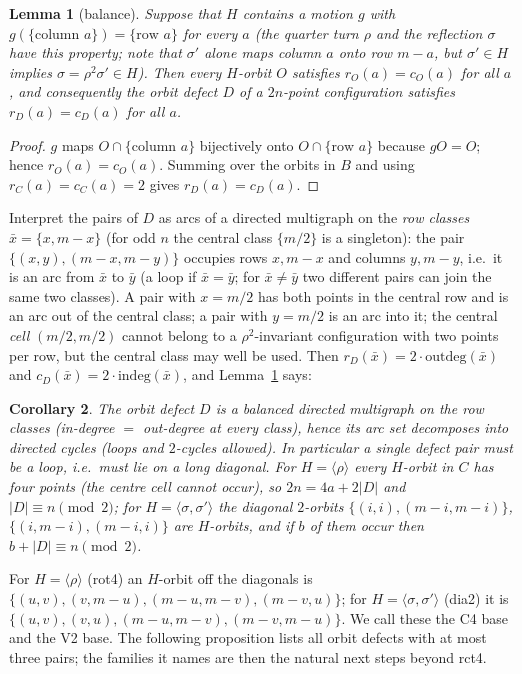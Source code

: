 \documentclass[11pt]{article}
\newtheorem{lemma}{Lemma}
\newtheorem{corollary}[lemma]{Corollary}
\theoremstyle{remark}
\newcommand{\rot}{\rho}
\begin{document}
\begin{lemma}[balance]\label{lem:balance}
Suppose that $H$ contains a motion $g$ with $g(\{\text{column }a\})=\{\text{row }a\}$ for every $a$ (the quarter turn
$\rot$ and the reflection $\sigma$ have this property; note that $\sigma'$ alone maps column $a$ onto row $m-a$, but
$\sigma'\in H$ implies $\sigma=\rot^2\sigma'\in H$).  Then every $H$-orbit $O$ satisfies $r_O(a)=c_O(a)$ for all $a$, and
consequently the orbit defect $D$ of a $2n$-point configuration satisfies $r_D(a)=c_D(a)$ for all $a$.
\end{lemma}
\begin{proof}
$g$ maps $O\cap\{\text{column }a\}$ bijectively onto $O\cap\{\text{row }a\}$ because $gO=O$; hence $r_O(a)=c_O(a)$.
Summing over the orbits in $B$ and using $r_C(a)=c_C(a)=2$ gives $r_D(a)=c_D(a)$.
\end{proof}

Interpret the pairs of $D$ as arcs of a directed multigraph on the \emph{row classes} $\bar x=\{x,m-x\}$ (for odd $n$ the
central class $\{m/2\}$ is a singleton): the pair $\{(x,y),(m-x,m-y)\}$ occupies rows $x,m-x$ and columns $y,m-y$, i.e.\ it
is an arc from $\bar x$ to $\bar y$ (a loop if $\bar x=\bar y$; for $\bar x\ne\bar y$ two different pairs can join the same
two classes).  A pair with $x=m/2$ has both points in the central row and is an arc out of the central class; a pair with
$y=m/2$ is an arc into it; the central \emph{cell} $(m/2,m/2)$ cannot belong to a $\rot^2$-invariant configuration with two
points per row, but the central class may well be used.  Then $r_D(\bar x)=2\cdot\mathrm{outdeg}(\bar x)$ and
$c_D(\bar x)=2\cdot\mathrm{indeg}(\bar x)$, and Lemma~\ref{lem:balance} says:

\begin{corollary}\label{cor:euler}
The orbit defect $D$ is a balanced directed multigraph on the row classes (in-degree $=$ out-degree at every class), hence
its arc set decomposes into directed cycles (loops and $2$-cycles allowed).  In particular a single defect pair must be a
loop, i.e.\ must lie on a long diagonal.  For $H=\langle\rot\rangle$ every $H$-orbit in $C$ has four points (the centre cell
cannot occur), so $2n=4a+2|D|$ and $|D|\equiv n\pmod 2$; for $H=\langle\sigma,\sigma'\rangle$ the diagonal $2$-orbits
$\{(i,i),(m-i,m-i)\}$, $\{(i,m-i),(m-i,i)\}$ are $H$-orbits, and if $b$ of them occur then $b+|D|\equiv n\pmod2$.
\end{corollary}

For $H=\langle\rot\rangle$ (rot4) an $H$-orbit off the diagonals is $\{(u,v),(v,m-u),(m-u,m-v),(m-v,u)\}$; for
$H=\langle\sigma,\sigma'\rangle$ (dia2) it is $\{(u,v),(v,u),(m-u,m-v),(m-v,m-u)\}$.  We call these the C4 base and the
V2 base.  The following proposition lists all orbit defects with at most three pairs; the families it names are then the
natural next steps beyond rct4.
\end{document}
